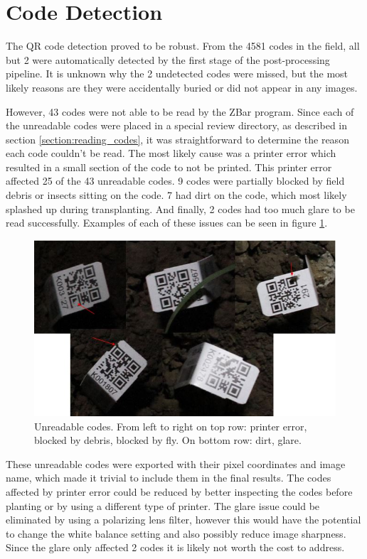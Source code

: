\section{Code Detection}

The QR code detection proved to be robust. From the 4581 codes in the field, all but 2 were automatically detected by the first stage of the post-processing pipeline.  It is unknown why the 2 undetected codes were missed, but the most likely reasons are they were accidentally buried or did not appear in any images.  

However, 43 codes were not able to be read by the ZBar program.  Since each of the unreadable codes were placed in a special review directory, as described in section \ref{section:reading_codes}, it was straightforward to determine the reason each code couldn't be read.  The most likely cause was a printer error which resulted in a small section of the code to not be printed.  This printer error affected 25 of the 43 unreadable codes.  9 codes were partially blocked by field debris or insects sitting on the code.  7 had dirt on the code, which most likely splashed up during transplanting. And finally, 2 codes had too much glare to be read successfully.  Examples of each of these issues can be seen in figure \ref{figure:missed_codes}. 

\begin{figure}
	\centering
    \includegraphics[width=5in]{figures/missed_codes.jpg}
    \caption[Unreadable QR codes]{Unreadable codes.  From left to right on top row: printer error, blocked by debris, blocked by fly. On bottom row: dirt, glare.}
    \label{figure:missed_codes}
\end{figure}

These unreadable codes were exported with their pixel coordinates and image name, which made it trivial to include them in the final results. The codes affected by printer error could be reduced by better inspecting the codes before planting or by using a different type of printer.  The glare issue could be eliminated by using a polarizing lens filter, however this would have the potential to change the white balance setting and also possibly reduce image sharpness.  Since the glare only affected 2 codes it is likely not worth the cost to address.  

